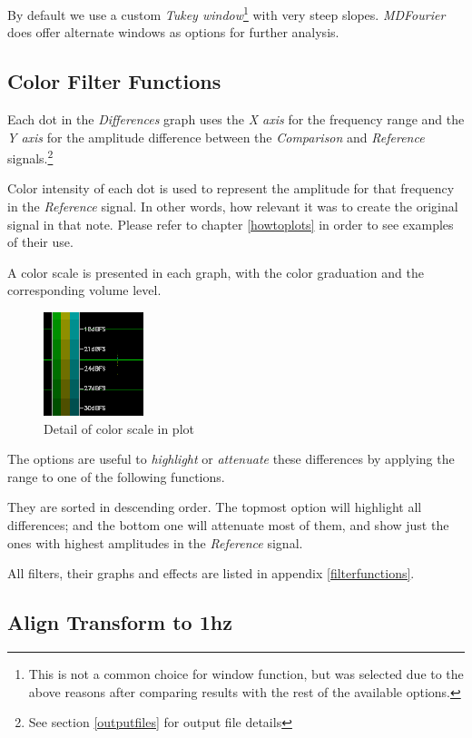 \documentclass[10pt,a4paper]{report}
\begin{document}
By default we use a custom \textit{Tukey window}\footnote{This is not a common choice for window function, but was selected due to the above reasons after comparing results with  the rest of the available options.} with very steep slopes. \textit{MDFourier} does offer alternate windows as options for further analysis.

\subsection{Color Filter Functions}
\label{colorfilter}

Each dot in the \textit{Differences} graph uses the \textit{X axis} for the frequency range and the \textit{Y axis} for the amplitude difference between the \textit{Comparison} and \textit{Reference} signals.\footnote{See section \ref{outputfiles} for output file details}

Color intensity of each dot is used to represent the amplitude for that frequency in the \textit{Reference} signal. In other words, how relevant it was to create the original signal in that note. Please refer to chapter \ref{howtoplots} in order to see examples of their use.

A color scale is presented in each graph, with the color graduation and the corresponding volume level.

\begin{figure}[H]
	\centering
	\includegraphics[width=0.2\linewidth]{plots/colorscale.png}
	\caption[Plot color scale]{Detail of color scale in plot}
	\label{fig:colorscale}
\end{figure}

The options are useful to \textit{highlight} or \textit{attenuate} these differences by applying the range to one of the following functions. 

They are sorted in descending order. The topmost option will highlight all differences; and the bottom one will attenuate most of them, and show just the ones with highest amplitudes in the \textit{Reference} signal.

All filters, their graphs and effects are listed in appendix \ref{filterfunctions}.

\subsection{Align Transform to 1hz}
\end{document}

